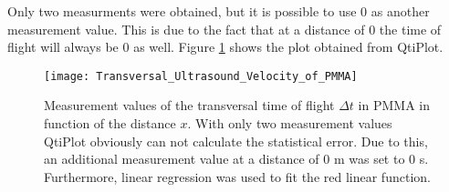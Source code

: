 Only two measurments were obtained, but it is possible to use $0$ as another measurement value. This is due to the fact that at a distance of $0$ the time of flight will always be $0$ as well. Figure \ref{fig:Transversal_Ultrasound_Velocity_of_PMMA} shows the plot obtained from QtiPlot.

\begin{figure}[H]
	\centering
	\texttt{[image: Transversal\_Ultrasound\_Velocity\_of\_PMMA]}
	\caption{Measurement values of the transversal time of flight $\Delta t$ in PMMA in function of the distance $x$. With only two measurement values QtiPlot obviously can not calculate the statistical error. Due to this, an additional measurement value at a distance of $0$ m was set to $0$ s. Furthermore, linear regression was used to fit the red linear function.}
	\label{fig:Transversal_Ultrasound_Velocity_of_PMMA}
\end{figure}
